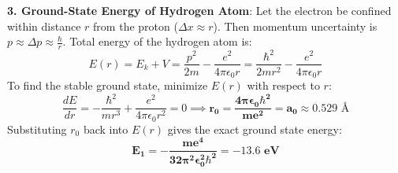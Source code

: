 \begin{theorysol}
\textbf{3. Ground-State Energy of Hydrogen Atom}:
Let the electron be confined within distance $r$ from the proton ($\Delta x \approx r$).
Then momentum uncertainty is $p \approx \Delta p \approx \frac{\hbar}{r}$.
Total energy of the hydrogen atom is:
\begin{equation}
E(r) = E_k + V = \frac{p^2}{2m} - \frac{e^2}{4\pi\epsilon_0 r} = \frac{\hbar^2}{2m r^2} - \frac{e^2}{4\pi\epsilon_0 r}
\end{equation}
To find the stable ground state, minimize $E(r)$ with respect to $r$:
\begin{equation}
\frac{dE}{dr} = -\frac{\hbar^2}{m r^3} + \frac{e^2}{4\pi\epsilon_0 r^2} = 0 \implies \mathbf{r_0 = \frac{4\pi\epsilon_0 \hbar^2}{m e^2} = a_0 \approx 0.529\text{ \AA}}
\end{equation}
Substituting $r_0$ back into $E(r)$ gives the exact ground state energy:
\begin{equation}
\mathbf{E_1 = -\frac{m e^4}{32\pi^2\epsilon_0^2\hbar^2} = -13.6\text{ eV}}
\end{equation}
\end{theorysol}
\vspace{4mm}

